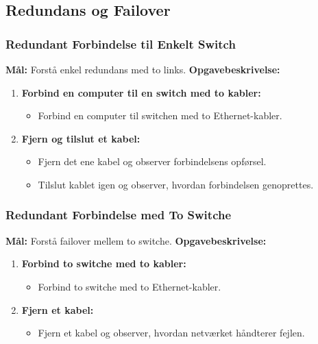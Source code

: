 \subsection{Redundans og Failover}
\subsubsection*{Redundant Forbindelse til Enkelt Switch}
\textbf{Mål:} Forstå enkel redundans med to links.
\newline\newline\noindent
\textbf{Opgavebeskrivelse:}
\begin{enumerate}
	\item \textbf{Forbind en computer til en switch med to kabler:}
	\begin{itemize}
		\item Forbind en computer til switchen med to Ethernet-kabler.
	\end{itemize}
	\item \textbf{Fjern og tilslut et kabel:}
	\begin{itemize}
		\item Fjern det ene kabel og observer forbindelsens opførsel.
		\item Tilslut kablet igen og observer, hvordan forbindelsen genoprettes.
	\end{itemize}
\end{enumerate}

\subsubsection*{Redundant Forbindelse med To Switche}
\textbf{Mål:} Forstå failover mellem to switche.
\newline\newline\noindent
\textbf{Opgavebeskrivelse:}
\begin{enumerate}
	\item \textbf{Forbind to switche med to kabler:}
	\begin{itemize}
		\item Forbind to switche med to Ethernet-kabler.
	\end{itemize}
	\item \textbf{Fjern et kabel:}
	\begin{itemize}
		\item Fjern et kabel og observer, hvordan netværket håndterer fejlen.
	\end{itemize}
\end{enumerate}

